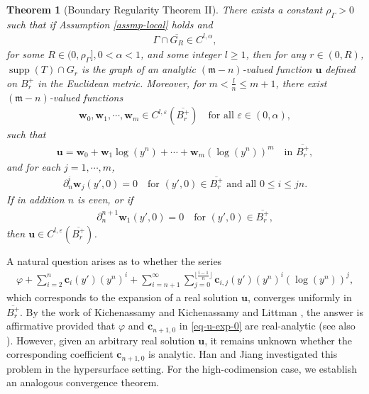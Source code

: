 \documentclass[11pt,reqno]{amsart}
\newcommand{\fm}{\mathfrak{m}}
\renewcommand{\epsilon}{\varepsilon}
\renewcommand{\leq}{\leqslant}
\renewcommand{\geq}{\geqslant}
\newtheorem{theorem}{Theorem}[section]
\theoremstyle{definition}
\numberwithin{equation}{section}
\begin{document}
\begin{theorem}[Boundary Regularity Theorem II]\label{thm-BRT2}
There exists a constant $\rho_\Gamma>0$ such that if Assumption \ref{assmp-local} holds and
\begin{align}
\Gamma \cap \overline{G_R} \in C^{l,\alpha},
\end{align}
for some $R\in (0, \rho_\Gamma], 0<\alpha<1$, and some integer $l\geq 1$, then for any $r\in (0, R)$, $\operatorname{supp}(T) \cap G_r$ is the graph of an analytic $(\fm-n)$-valued function $\mathbf{u}$ defined on $B^+_r$ in the Euclidean metric. Moreover, for $m<\frac{l}{n}\leq m+1$, there exist $(\fm-n)$-valued functions
\begin{align}
    \mathbf{w}_0, \mathbf{w}_1, \cdots, \mathbf{w}_m \in C^{l,\epsilon}(\overline{B^+_r}) \quad \text{for all } \epsilon\in (0, \alpha),
\end{align}
such that
\begin{align}
    \mathbf{u} =  \mathbf{w}_0 + \mathbf{w}_1 \log (y^n) + \cdots + \mathbf{w}_m (\log (y^n))^m \quad \text{in } \overline{B^+_r},
\end{align}
and for each $j=1,\cdots, m$,
\begin{align}
    \partial_n^i \mathbf{w}_j(y', 0)=0 \quad \text{for } (y', 0) \in \overline{B^+_r} \text{ and all } 0\leq i\leq jn.
\end{align}
If in addition $n$ is even, or if
\begin{align}
\partial_n^{n+1} \mathbf{w}_1(y', 0)=0 \quad \text{for } (y', 0) \in \overline{B^+_r},
\end{align}
then $\mathbf{u} \in C^{l, \epsilon}(\overline{B^+_r})$.
\end{theorem}
A natural question arises as to whether the series
\begin{align}\label{eq-u-series}
\varphi +\sum_{i=2}^{n}\mathbf{c}_i(y')(y^n)^i +\sum_{i=n+1}^\infty\sum_{j=0}^{\lfloor \frac{i-1}{n}\rfloor} \mathbf{c}_{i,j}(y')(y^n)^i(\log(y^n))^j,
\end{align}
which corresponds to the expansion of a real solution $\mathbf u$, converges uniformly in $\overline{B^+_r}$. By the work of Kichenassamy \cite{K2} and Kichenassamy and Littman \cite{KL1, KL2}, the answer is affirmative provided that $\varphi$ and $\mathbf{c}_{n+1,0}$ in \eqref{eq-u-exp-0} are real-analytic (see also \cite{K1}). However, given an arbitrary real solution $\mathbf{u}$, it remains unknown whether the corresponding coefficient $\mathbf{c}_{n+1,0}$ is analytic. Han and Jiang \cite{HanJiang1} investigated this problem in the hypersurface setting. For the high-codimension case, we establish an analogous convergence theorem.
\end{document}
